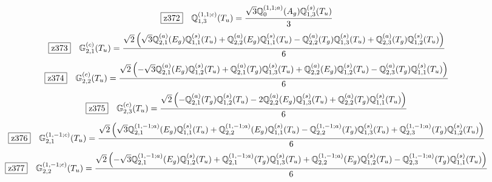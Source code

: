\documentclass[fleqn,10pt,landscape]{jsarticle}
\begin{document}
\begin{dmath*}
\hspace*{3mm}\fbox{z372}\quad \mathbb{Q}_{1,3}^{(1,1;c)}(T_{u})=\frac{\sqrt{3} \mathbb{Q}_{0}^{(1,1;a)}(A_{g}) \mathbb{Q}_{1,3}^{(s)}(T_{u})}{3}
\end{dmath*}
\begin{dmath*}
\hspace*{3mm}\fbox{z373}\quad \mathbb{G}_{2,1}^{(c)}(T_{u})=\frac{\sqrt{2} \left(\sqrt{3} \mathbb{Q}_{2,1}^{(a)}(E_{g}) \mathbb{Q}_{1,1}^{(s)}(T_{u}) + \mathbb{Q}_{2,2}^{(a)}(E_{g}) \mathbb{Q}_{1,1}^{(s)}(T_{u}) - \mathbb{Q}_{2,2}^{(a)}(T_{g}) \mathbb{Q}_{1,3}^{(s)}(T_{u}) + \mathbb{Q}_{2,3}^{(a)}(T_{g}) \mathbb{Q}_{1,2}^{(s)}(T_{u})\right)}{6}
\end{dmath*}
\begin{dmath*}
\hspace*{3mm}\fbox{z374}\quad \mathbb{G}_{2,2}^{(c)}(T_{u})=\frac{\sqrt{2} \left(- \sqrt{3} \mathbb{Q}_{2,1}^{(a)}(E_{g}) \mathbb{Q}_{1,2}^{(s)}(T_{u}) + \mathbb{Q}_{2,1}^{(a)}(T_{g}) \mathbb{Q}_{1,3}^{(s)}(T_{u}) + \mathbb{Q}_{2,2}^{(a)}(E_{g}) \mathbb{Q}_{1,2}^{(s)}(T_{u}) - \mathbb{Q}_{2,3}^{(a)}(T_{g}) \mathbb{Q}_{1,1}^{(s)}(T_{u})\right)}{6}
\end{dmath*}
\begin{dmath*}
\hspace*{3mm}\fbox{z375}\quad \mathbb{G}_{2,3}^{(c)}(T_{u})=\frac{\sqrt{2} \left(- \mathbb{Q}_{2,1}^{(a)}(T_{g}) \mathbb{Q}_{1,2}^{(s)}(T_{u}) - 2 \mathbb{Q}_{2,2}^{(a)}(E_{g}) \mathbb{Q}_{1,3}^{(s)}(T_{u}) + \mathbb{Q}_{2,2}^{(a)}(T_{g}) \mathbb{Q}_{1,1}^{(s)}(T_{u})\right)}{6}
\end{dmath*}
\begin{dmath*}
\hspace*{3mm}\fbox{z376}\quad \mathbb{G}_{2,1}^{(1,-1;c)}(T_{u})=\frac{\sqrt{2} \left(\sqrt{3} \mathbb{Q}_{2,1}^{(1,-1;a)}(E_{g}) \mathbb{Q}_{1,1}^{(s)}(T_{u}) + \mathbb{Q}_{2,2}^{(1,-1;a)}(E_{g}) \mathbb{Q}_{1,1}^{(s)}(T_{u}) - \mathbb{Q}_{2,2}^{(1,-1;a)}(T_{g}) \mathbb{Q}_{1,3}^{(s)}(T_{u}) + \mathbb{Q}_{2,3}^{(1,-1;a)}(T_{g}) \mathbb{Q}_{1,2}^{(s)}(T_{u})\right)}{6}
\end{dmath*}
\begin{dmath*}
\hspace*{3mm}\fbox{z377}\quad \mathbb{G}_{2,2}^{(1,-1;c)}(T_{u})=\frac{\sqrt{2} \left(- \sqrt{3} \mathbb{Q}_{2,1}^{(1,-1;a)}(E_{g}) \mathbb{Q}_{1,2}^{(s)}(T_{u}) + \mathbb{Q}_{2,1}^{(1,-1;a)}(T_{g}) \mathbb{Q}_{1,3}^{(s)}(T_{u}) + \mathbb{Q}_{2,2}^{(1,-1;a)}(E_{g}) \mathbb{Q}_{1,2}^{(s)}(T_{u}) - \mathbb{Q}_{2,3}^{(1,-1;a)}(T_{g}) \mathbb{Q}_{1,1}^{(s)}(T_{u})\right)}{6}
\end{dmath*}
\end{document}
